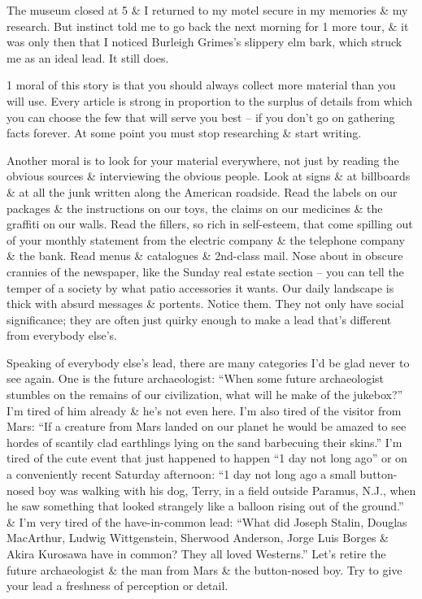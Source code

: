 \documentclass{article}
\begin{document}
The museum closed at 5 \& I returned to my motel secure in my memories \& my research. But instinct told me to go back the next morning for 1 more tour, \& it was only then that I noticed Burleigh Grimes's slippery elm bark, which struck me as an ideal lead. It still does.

1 moral of this story is that you should always collect more material than you will use. Every article is strong in proportion to the surplus of details from which you can choose the few that will serve you best -- if you don't go on gathering facts forever. At some point you must stop researching \& start writing.

Another moral is to look for your material everywhere, not just by reading the obvious sources \& interviewing the obvious people. Look at signs \& at billboards \& at all the junk written along the American roadside. Read the labels on our packages \& the instructions on our toys, the claims on our medicines \& the graffiti on our walls. Read the fillers, so rich in self-esteem, that come spilling out of your monthly statement from the electric company \& the telephone company \& the bank. Read menus \& catalogues \& 2nd-class mail. Nose about in obscure crannies of the newspaper, like the Sunday real estate section -- you can tell the temper of a society by what patio accessories it wants. Our daily landscape is thick with absurd messages \& portents. Notice them. They not only have social significance; they are often just quirky enough to make a lead that's different from everybody else's.

Speaking of everybody else's lead, there are many categories I'd be glad never to see again. One is the future archaeologist: ``When some future archaeologist stumbles on the remains of our civilization, what will he make of the jukebox?'' I'm tired of him already \& he's not even here. I'm also tired of the visitor from Mars: ``If a creature from Mars landed on our planet he would be amazed to see hordes of scantily clad earthlings lying on the sand barbecuing their skins.'' I'm tired of the cute event that just happened to happen ``1 day not long ago'' or on a conveniently recent Saturday afternoon: ``1 day not long ago a small button-nosed boy was walking with his dog, Terry, in a field outside Paramus, N.J., when he saw something that looked strangely like a balloon rising out of the ground.'' \& I'm very tired of the have-in-common lead: ``What did Joseph Stalin, Douglas MacArthur, Ludwig Wittgenstein, Sherwood Anderson, Jorge Luis Borges \& Akira Kurosawa have in common? They all loved Westerns.'' Let's retire the future archaeologist \& the man from Mars \& the button-nosed boy. Try to give your lead a freshness of perception or detail.
\end{document}

